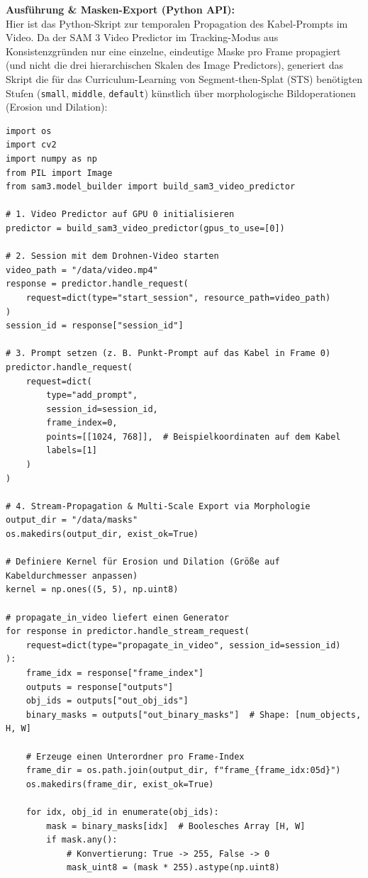 \documentclass[12pt,a4paper]{article}
\begin{document}
\textbf{Ausführung \& Masken-Export (Python API):}\\
Hier ist das Python-Skript zur temporalen Propagation des Kabel-Prompts im Video. Da der SAM 3 Video Predictor im Tracking-Modus aus Konsistenzgründen nur eine einzelne, eindeutige Maske pro Frame propagiert (und nicht die drei hierarchischen Skalen des Image Predictors), generiert das Skript die für das Curriculum-Learning von Segment-then-Splat (STS) benötigten Stufen (\texttt{small}, \texttt{middle}, \texttt{default}) künstlich über morphologische Bildoperationen (Erosion und Dilation):
\begin{verbatim}
import os
import cv2
import numpy as np
from PIL import Image
from sam3.model_builder import build_sam3_video_predictor

# 1. Video Predictor auf GPU 0 initialisieren
predictor = build_sam3_video_predictor(gpus_to_use=[0])

# 2. Session mit dem Drohnen-Video starten
video_path = "/data/video.mp4"
response = predictor.handle_request(
    request=dict(type="start_session", resource_path=video_path)
)
session_id = response["session_id"]

# 3. Prompt setzen (z. B. Punkt-Prompt auf das Kabel in Frame 0)
predictor.handle_request(
    request=dict(
        type="add_prompt",
        session_id=session_id,
        frame_index=0,
        points=[[1024, 768]],  # Beispielkoordinaten auf dem Kabel
        labels=[1]
    )
)

# 4. Stream-Propagation & Multi-Scale Export via Morphologie
output_dir = "/data/masks"
os.makedirs(output_dir, exist_ok=True)

# Definiere Kernel für Erosion und Dilation (Größe auf Kabeldurchmesser anpassen)
kernel = np.ones((5, 5), np.uint8)

# propagate_in_video liefert einen Generator
for response in predictor.handle_stream_request(
    request=dict(type="propagate_in_video", session_id=session_id)
):
    frame_idx = response["frame_index"]
    outputs = response["outputs"]
    obj_ids = outputs["out_obj_ids"]
    binary_masks = outputs["out_binary_masks"]  # Shape: [num_objects, H, W]

    # Erzeuge einen Unterordner pro Frame-Index
    frame_dir = os.path.join(output_dir, f"frame_{frame_idx:05d}")
    os.makedirs(frame_dir, exist_ok=True)

    for idx, obj_id in enumerate(obj_ids):
        mask = binary_masks[idx]  # Boolesches Array [H, W]
        if mask.any():
            # Konvertierung: True -> 255, False -> 0
            mask_uint8 = (mask * 255).astype(np.uint8)
            

\end{verbatim}
\end{document}
